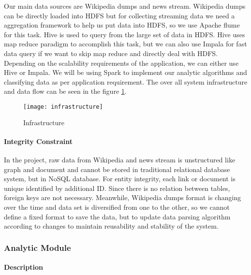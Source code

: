 Our main data sources are Wikipedia dumps and news stream. Wikipedia dumps can be directly loaded into HDFS but for collecting streaming data we need a aggregation framework to help us put data into HDFS, so we use Apache flume for this task. Hive is used to query from the large set of data in HDFS. Hive uses map reduce paradigm to accomplish this task, but we can also use Impala for fast data query if we want to skip map reduce and directly deal with HDFS. Depending on the scalability requirements of the application, we can either use Hive or Impala. We will be using Spark to implement our analytic algorithms and classifying data as per application requirement. The over all system infrastructure and data flow can be seen in the figure  \ref{fig:infrastructure}.

\begin{figure}[!ht]
\centering
\texttt{[image: infrastructure]}
\caption{Infrastructure}
\label{fig:infrastructure}
\end{figure}

\paragraph{Integrity Constraint}

In the project, raw data from Wikipedia and news stream is unstructured like graph and document and cannot be stored in traditional relational database system, but in NoSQL database. For entity integrity, each link or document is unique identified by additional ID. Since there is no relation between tables, foreign keys are not necessary. Meanwhile, Wikipedia dumps format is changing over the time and data set is diversified from one to the other, so we cannot define a fixed format to save the data, but to update data parsing algorithm according to changes to maintain reusability and stability of the system.

\subsubsection{Analytic Module}

\paragraph{Description}\mbox{}

